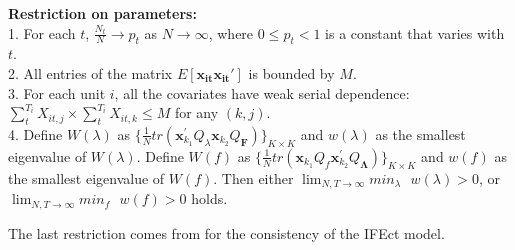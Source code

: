 \documentclass[12pt]{article}
\begin{document}
\noindent\textbf{Restriction on parameters:}\\
1.  For each $t$, $\frac{N_t}{N} \rightarrow p_t$ as $N \rightarrow \infty$, where $0 \leq p_t < 1$ is a constant that varies with $t$.  \\
2. All entries of the matrix $E\left[\mathbf{x_{it}}\mathbf{x_{it}}' \right]$ is bounded by $M$. \\
3. For each unit $i$, all the covariates have weak serial dependence: $\sum_{t}^{T_i}X_{it, j} \times \sum_{t}^{T_i}X_{it, k} \leq M$ for any $(k, j)$. \\
4. Define $W(\lambda)$ as $\{\frac{1}{N}tr \left(\mathbf{x}^{'}_{k_1}Q_{\lambda}\mathbf{x}_{k_2}Q_{\mathbf{F}} \right)\}_{K \times K}$ and $w(\lambda)$ as the smallest eigenvalue of $W(\lambda)$. Define $W(f)$ as $\{\frac{1}{N}tr \left(\mathbf{x}_{k_1}Q_{f}\mathbf{x}^{'}_{k_2}Q_{\mathbf{\Lambda}} \right)\}_{K \times K}$ and $w(f)$ as the smallest eigenvalue of $W(f)$. Then either $\lim_{N,T \rightarrow \infty} min_{\lambda}\text{ } w(\lambda) > 0$, or $\lim_{N,T \rightarrow \infty} min_{f}\text{ } w(f) > 0$ holds. 

The last restriction comes from \citet{MoonWeidner2013} for the consistency of the IFEct model.
\end{document}
